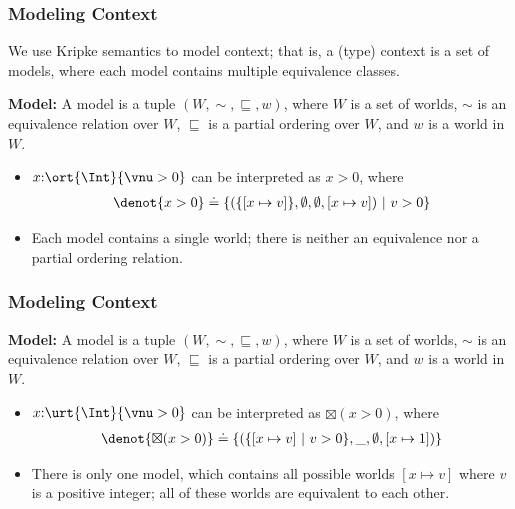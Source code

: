 \begin{frame}[fragile]
    \frametitle{Modeling Context}

We use Kripke semantics to model context; that is, a (type) context is a set of models, where each model contains multiple equivalence classes.

\textbf{Model:} A model is a tuple $(W, \sim, \sqsubseteq, w)$, where $W$ is a set of worlds, $\sim$ is an equivalence relation over $W$, $\sqsubseteq$ is a partial ordering over $W$, and $w$ is a world in $W$.

\begin{itemize}
    \item $x{:}\ort{\Int}{\vnu > 0}$ can be interpreted as $x > 0$, where
    \begin{align*}
        \denot{x > 0} \doteq \{ (\{[x\mapsto v]\}, \emptyset, \emptyset, [x\mapsto v]) ~|~ v > 0 \}
    \end{align*}
    \item Each model contains a single world; there is neither an equivalence nor a partial ordering relation.
\end{itemize}


\end{frame}

\begin{frame}[fragile]
    \frametitle{Modeling Context}

\textbf{Model:} A model is a tuple $(W, \sim, \sqsubseteq, w)$, where $W$ is a set of worlds, $\sim$ is an equivalence relation over $W$, $\sqsubseteq$ is a partial ordering over $W$, and $w$ is a world in $W$.

\begin{itemize}
    \item $x{:}\urt{\Int}{\vnu > 0}$ can be interpreted as $\boxtimes (x > 0)$, where
    \begin{align*}
        \denot{\boxtimes (x > 0)} \doteq \{ (\{[x\mapsto v] ~|~ v > 0\}, \_, \emptyset, [x\mapsto 1]) \}
    \end{align*}
    \item There is only one model, which contains all possible worlds $[x\mapsto v]$ where $v$ is a positive integer; all of these worlds are equivalent to each other.
\end{itemize}


\end{frame}

